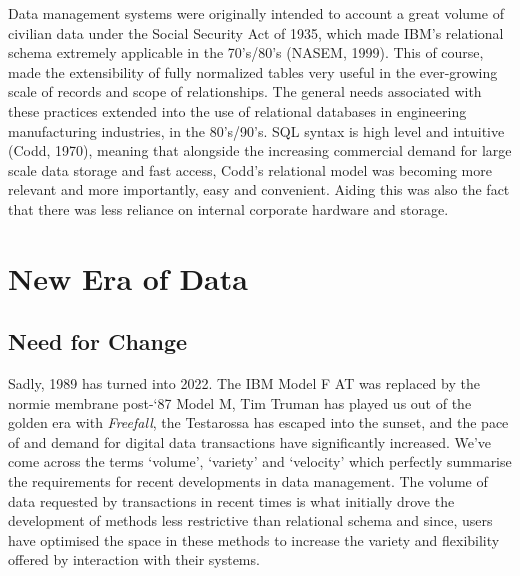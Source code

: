 \documentclass[11pt, english]{article}
\begin{document}
	Data management systems were originally intended to account a great volume of civilian data under the Social Security Act of 1935, which made IBM's relational schema extremely applicable in the 70's/80's (NASEM, 1999). This of course, made the extensibility of fully normalized tables very useful in the ever-growing scale of records and scope of relationships. The general needs associated with these practices extended into the use of relational databases in engineering manufacturing industries, in the 80's/90's. SQL syntax is high level and intuitive (Codd, 1970), meaning that alongside the increasing commercial demand for large scale data storage and fast access, Codd's relational model was becoming more relevant and more importantly, easy and convenient. Aiding this was also the fact that there was less reliance on internal corporate hardware and storage.

\section{New Era of Data}

	\subsection{Need for Change}

Sadly, 1989 has turned into 2022. The IBM Model F AT was replaced by the normie membrane post-`87 Model M, Tim Truman has played us out of the golden era with \textit{Freefall}, the Testarossa has escaped into the sunset, and the pace of and demand for digital data transactions have significantly increased. We've come across the terms `volume', `variety' and `velocity' which perfectly summarise the requirements for recent developments in data management. The volume of data requested by transactions in recent times is what initially drove the development of methods less restrictive than relational schema and since, users have optimised the space in these methods to increase the variety and flexibility offered by interaction with their systems.\\
\end{document}
